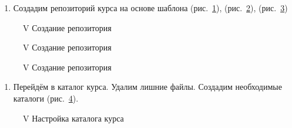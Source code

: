\documentclass[
  english,
  russian,
  12pt,
  a4paper,
  DIV=11,
  numbers=noendperiod]{scrreprt}
\providecommand{\tightlist}{%
  \setlength{\itemsep}{0pt}\setlength{\parskip}{0pt}}
\begin{document}
\begin{enumerate}
\def\labelenumi{\arabic{enumi})}
\setcounter{enumi}{5}
\tightlist
\item
  Создадим репозиторий курса на основе шаблона (рис.~\ref{fig-010}),
  (рис.~\ref{fig-011}), (рис.~\ref{fig-012})
\end{enumerate}

\begin{figure}


\caption{\label{fig-010}V Создание репозитория}

\end{figure}%

\begin{figure}


\caption{\label{fig-011}V Создание репозитория}

\end{figure}%

\begin{figure}


\caption{\label{fig-012}V Создание репозитория}

\end{figure}%

\begin{enumerate}
\def\labelenumi{\arabic{enumi})}
\setcounter{enumi}{6}
\tightlist
\item
  Перейдём в каталог курса. Удалим лишние файлы. Создадим необходимые
  каталоги (рис.~\ref{fig-013}).
\end{enumerate}

\begin{figure}


\caption{\label{fig-013}V Настройка каталога курса}

\end{figure}%
\end{document}
